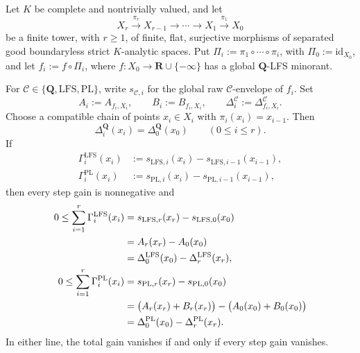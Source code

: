 
\begin{theorem}
\label{thm:p031-finite-flat-tower-defect-additivity}
Let $K$ be complete and nontrivially valued, and let
\[
 X_r\xrightarrow{\pi_r}X_{r-1}\longrightarrow\cdots
   \longrightarrow X_1\xrightarrow{\pi_1}X_0
\]
be a finite tower, with $r\geq1$, of finite, flat, surjective morphisms of
separated good boundaryless strict $K$-analytic spaces.  Put
$\Pi_i:=\pi_1\circ\cdots\circ\pi_i$, with $\Pi_0:=\mathrm{id}_{X_0}$,
and let $f_i:=f\circ\Pi_i$, where
$f:X_0\to\mathbf R\cup\{-\infty\}$ has a global $\mathbf Q$-LFS
minorant.

For $\mathcal C\in\{\mathbf Q,\mathrm{LFS},\mathrm{PL}\}$, write
$s_{\mathcal C,i}$ for the global raw $\mathcal C$-envelope of $f_i$.
Set
\[
 A_i:=A_{f_i,X_i},\qquad B_i:=B_{f_i,X_i},\qquad
 \Delta_i^{\mathcal C}:=\Delta_{f_i,X_i}^{\mathcal C}.
\]
Choose a compatible chain of points
$x_i\in X_i$ with $\pi_i(x_i)=x_{i-1}$.  Then
\begin{equation}
\label{eq:p031-tower-rational-defect-conservation}
 \Delta_i^{\mathbf Q}(x_i)=\Delta_0^{\mathbf Q}(x_0)
 \qquad(0\leq i\leq r).
\end{equation}
If
\begin{align*}
 \Gamma_i^{\mathrm{LFS}}(x_i)
   &:=s_{\mathrm{LFS},i}(x_i)-s_{\mathrm{LFS},i-1}(x_{i-1}),\\
 \Gamma_i^{\mathrm{PL}}(x_i)
   &:=s_{\mathrm{PL},i}(x_i)-s_{\mathrm{PL},i-1}(x_{i-1}),
\end{align*}
then every step gain is nonnegative and
\begin{align}
 0\leq\sum_{i=1}^{r}\Gamma_i^{\mathrm{LFS}}(x_i)
   &=s_{\mathrm{LFS},r}(x_r)-s_{\mathrm{LFS},0}(x_0) \notag\\
   &=A_r(x_r)-A_0(x_0) \notag\\
   &=\Delta_0^{\mathrm{LFS}}(x_0)
       -\Delta_r^{\mathrm{LFS}}(x_r),
\label{eq:p031-tower-lfs-gain-additivity}\\
 0\leq\sum_{i=1}^{r}\Gamma_i^{\mathrm{PL}}(x_i)
   &=s_{\mathrm{PL},r}(x_r)-s_{\mathrm{PL},0}(x_0) \notag\\
   &=\bigl(A_r(x_r)+B_r(x_r)\bigr)
       -\bigl(A_0(x_0)+B_0(x_0)\bigr) \notag\\
   &=\Delta_0^{\mathrm{PL}}(x_0)
       -\Delta_r^{\mathrm{PL}}(x_r).
\label{eq:p031-tower-pl-gain-additivity}
\end{align}
In either line, the total gain vanishes if and only if every step gain
vanishes.
\end{theorem}

